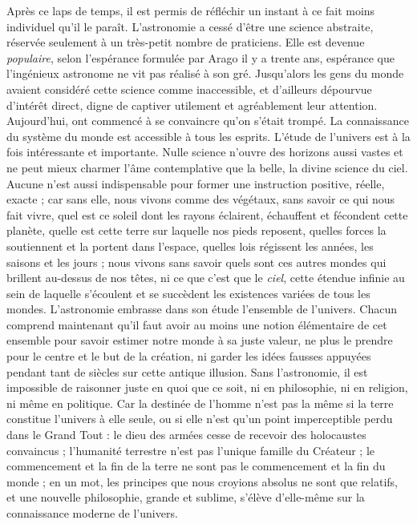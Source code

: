 \documentclass[a4paper, 11pt, oneside, landscape]{article}
\begin{document}
Après ce laps de temps, il est permis de réfléchir un instant à ce fait moins individuel qu'il le paraît. L'astronomie a cessé d'être une science abstraite, réservée seulement à un très-petit nombre de praticiens. Elle est devenue \emph{populaire}, selon l'espérance formulée par Arago il y a trente ans, espérance que l'ingénieux astronome ne vit pas réalisé à son gré. Jusqu'alors les gens du monde avaient considéré cette science comme inaccessible, et d'ailleurs dépourvue d'intérêt direct, digne de captiver utilement et agréablement leur attention. Aujourd'hui, ont commencé à se convaincre qu'on s'était trompé. La connaissance du système du monde est accessible à tous les esprits. L'étude de l'univers est à la fois intéressante et importante. Nulle science n'ouvre des horizons aussi vastes et ne peut mieux charmer l'âme contemplative que la belle, la divine science du ciel. Aucune n'est aussi indispensable pour former une instruction positive, réelle, exacte ; car sans elle, nous vivons comme des végétaux, sans savoir ce qui nous fait vivre, quel est ce soleil dont les rayons éclairent, échauffent et fécondent cette planète, quelle est cette terre sur laquelle nos pieds reposent, quelles forces la soutiennent et la portent dans l'espace, quelles lois régissent les années, les saisons et les jours ; nous vivons sans savoir quels sont ces autres mondes qui brillent au-dessus de nos têtes, ni ce que c'est que le \emph{ciel}, cette étendue infinie au sein de laquelle s'écoulent et se succèdent les existences variées de tous les mondes. L'astronomie embrasse dans son étude l'ensemble de l'univers. Chacun comprend maintenant qu'il faut avoir au moins une notion élémentaire de cet ensemble pour savoir estimer notre monde à sa juste valeur, ne plus le prendre pour le centre et le but de la création, ni garder les idées fausses appuyées pendant tant de siècles sur cette antique illusion. Sans l'astronomie, il est impossible de raisonner juste en quoi que ce soit, ni en philosophie, ni en religion, ni même en politique. Car la destinée de l'homme n'est pas la même si la terre constitue l'univers à elle seule, ou si elle n'est qu'un point imperceptible perdu dans le Grand Tout : le dieu des armées cesse de recevoir des holocaustes convaincus ; l'humanité terrestre n'est pas l'unique famille du Créateur ; le commencement et la fin de la terre ne sont pas le commencement et la fin du monde ; en un mot, les principes que nous croyions absolus ne sont que relatifs, et une nouvelle philosophie, grande et sublime, s'élève d'elle-même sur la connaissance moderne de l'univers.
\end{document}
